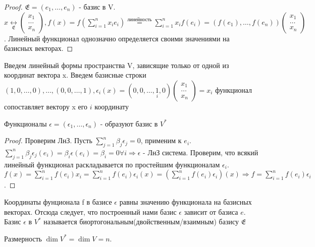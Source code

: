 \begin{proof}
	\(\mathfrak{E} = (e_1, \ldots, e_n)\) - базис в V. \(x\underset{\mathfrak{E}}{\longleftrightarrow} \begin{pmatrix}
		x_1 \\ \ldots \\ x_n
	\end{pmatrix}, f(x) = f(\sum_{i = 1}^{n}x_ie_i) \overset{\text{линейность}}{=} \sum_{i=1}^{n}x_if(e_i)  = (f(e_1), \ldots, f(e_n))\begin{pmatrix}
	x_1 \\ \ldots \\ x_n
	\end{pmatrix}\). Линейный функционал однозначно определяется своими значениями на базисных векторах.
\end{proof}
Введем линейный формы пространства V, зависящие только от одной из координат вектора x. Введем базисные строки \((1, 0, \ldots, 0), \ldots, (0, 0, \ldots, 1), \epsilon_i(x) = (0, 0,\ldots, \underset{i}{1}, 0)\begin{pmatrix}
	x_1 \\ \ldots \\ x_n
\end{pmatrix} = x_i\) функционал сопоставляет вектору x его \(i\) координату
\begin{proposition}
	Функционалы \(\mathfrak{\epsilon} = (\epsilon_1, \ldots, \epsilon_n)\) - образуют базис в \(V^{*}\)
\end{proposition}
\begin{proof}
	Проверим ЛнЗ. Пусть \(\sum_{j=1}^{n}\beta_j \epsilon_j = 0\), применим к \(e_i\). \(\sum_{j=1}^{n}\beta_j\epsilon_j(e_i) = \beta_i\epsilon(e_i) = \beta_i = 0 \forall i \Longrightarrow\epsilon\) - ЛнЗ система. \newline
	Проверим, что всякий линейный функционал раскладывается по простейшим функционалам \(\epsilon_i\). \(f(x) = \sum_{i=1}^{n}f(e_i)x_i = \sum_{i=1}^{n}f(e_i)\epsilon_i(x) = (\sum_{i=1}^{n}f(e_i)\epsilon_i)(x)\Longrightarrow f = \sum_{i=1}^{n}f(e_i)\epsilon_i\).
\end{proof}
\begin{corollary}
	Координаты фунционала f в базисе \(\epsilon\) равны значению функционала на базисных векторах. Отсюда следует, что построенный нами базис \(\epsilon\) зависит от базиса \(e\). Базис \(\mathfrak{\epsilon}\) в \(V^{*}\) называется биортогональным(двойственным/взаимным) базису \(\mathfrak{E}\) 
\end{corollary}
\begin{corollary}
	Размерность \(\dim V^{*} = \dim V = n\).
\end{corollary}
